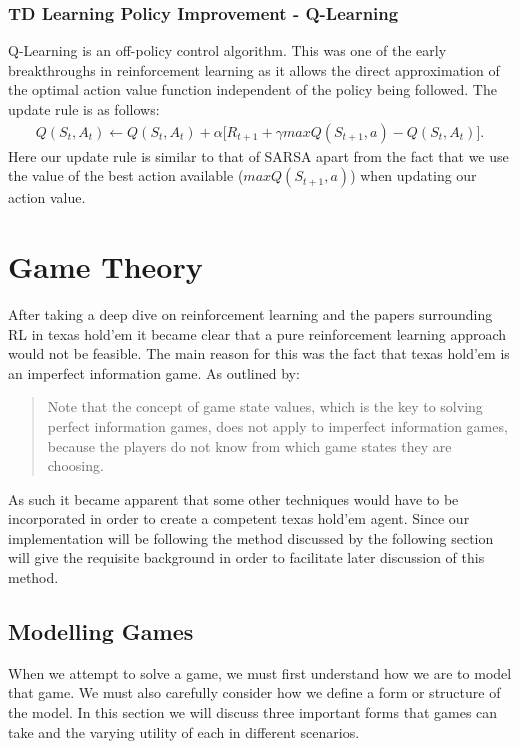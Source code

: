 \subsubsection{TD Learning Policy Improvement - Q-Learning}
Q-Learning is an off-policy control algorithm.
This was one of the early breakthroughs in reinforcement learning as it allows the direct approximation of
the optimal action value function independent of the policy being followed.
The update rule is as follows:
\begin{align}
    Q(S_t, A_t) \leftarrow Q(S_t, A_t) + \alpha \lbrack R_{t+1} + \gamma maxQ(S_{t+1}, a) - Q(S_t, A_t) \rbrack.
\end{align}
Here our update rule is similar to that of SARSA apart from the fact that we use the value of the best
action available ($maxQ(S_{t+1}, a)$) when updating our action value.

\section{Game Theory}\label{sec:gameTheory}
After taking a deep dive on reinforcement learning and the papers surrounding RL in texas hold'em it became
clear that a pure reinforcement learning approach would not be feasible.
The main reason for this was the fact that texas hold'em is an imperfect information game.
As outlined by\citep{dahl2001reinforcement}:
\begin{quotation}
Note that the concept of game state values, which is the key to solving perfect information games,
does not apply to imperfect information games, because the players do not know from  which game states they
are choosing.
\end{quotation}
As such it became apparent that some other techniques would have to be incorporated in order to create a competent
texas hold'em agent.
Since our implementation will be following the method discussed by\citep{heinrich2017reinforcement}
the following section will give the requisite background in order to facilitate later discussion of this method.

\subsection{Modelling Games}\label{subsec:modellingGames}
When we attempt to solve a game, we must first understand how we are to model that game.
We must also carefully consider how we define a form or structure of the model\citep{myerson2013game}.
In this section we will discuss three important forms that games can take and the varying utility
of each in different scenarios.

